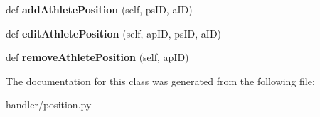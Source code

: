 \begin{DoxyCompactItemize}
def {\bfseries add\+Athlete\+Position} (self, ps\+ID, a\+ID)
\item 
\mbox{\label{classhandler_1_1position_1_1_position_handler_a6075c337d466c2961336152975b03212}} 
def {\bfseries edit\+Athlete\+Position} (self, ap\+ID, ps\+ID, a\+ID)
\item 
\mbox{\label{classhandler_1_1position_1_1_position_handler_a05fcd2fd393f86542f7124a36310eeea}} 
def {\bfseries remove\+Athlete\+Position} (self, ap\+ID)
\end{DoxyCompactItemize}


The documentation for this class was generated from the following file\+:\begin{DoxyCompactItemize}
\item 
handler/position.\+py\end{DoxyCompactItemize}
